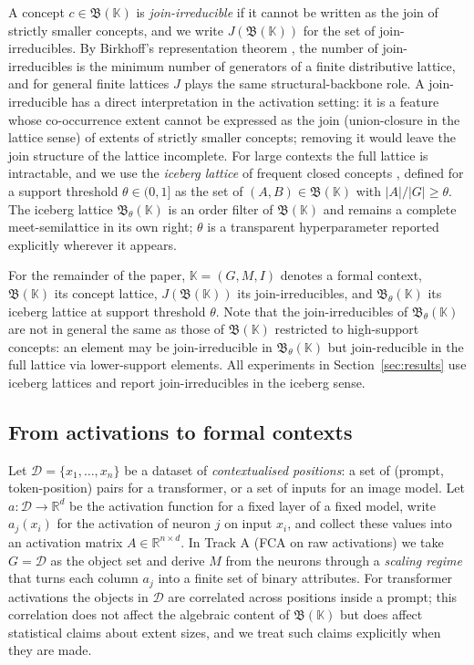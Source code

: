 \documentclass[a4paper,fleqn]{cas-dc}
\newcommand{\R}{\mathbb{R}}
\newcommand{\D}{\mathcal{D}}
\newcommand{\K}{\mathbb{K}}
\newcommand{\Lat}{\mathfrak{B}}
\newcommand{\Jirr}{J}
\begin{document}
A concept $c \in \Lat(\K)$ is \emph{join-irreducible} if it cannot be written as the join of strictly smaller concepts, and we write $\Jirr(\Lat(\K))$ for the set of join-irreducibles.
By Birkhoff's representation theorem \citep{birkhoff1937rings}, the number of join-irreducibles is the minimum number of generators of a finite distributive lattice, and for general finite lattices $\Jirr$ plays the same structural-backbone role.
A join-irreducible has a direct interpretation in the activation setting: it is a feature whose co-occurrence extent cannot be expressed as the join (union-closure in the lattice sense) of extents of strictly smaller concepts; removing it would leave the join structure of the lattice incomplete.
For large contexts the full lattice is intractable, and we use the \emph{iceberg lattice} of frequent closed concepts \citep{stumme2002computing}, defined for a support threshold $\theta \in (0, 1]$ as the set of $(A, B) \in \Lat(\K)$ with $|A|/|G| \ge \theta$.
The iceberg lattice $\Lat_\theta(\K)$ is an order filter of $\Lat(\K)$ and remains a complete meet-semilattice in its own right; $\theta$ is a transparent hyperparameter reported explicitly wherever it appears.

For the remainder of the paper, $\K = (G, M, I)$ denotes a formal context, $\Lat(\K)$ its concept lattice, $\Jirr(\Lat(\K))$ its join-irreducibles, and $\Lat_\theta(\K)$ its iceberg lattice at support threshold $\theta$.
Note that the join-irreducibles of $\Lat_\theta(\K)$ are not in general the same as those of $\Lat(\K)$ restricted to high-support concepts: an element may be join-irreducible in $\Lat_\theta(\K)$ but join-reducible in the full lattice via lower-support elements.
All experiments in Section~\ref{sec:results} use iceberg lattices and report join-irreducibles in the iceberg sense.

\subsection{From activations to formal contexts}\label{ssec:scaling}

Let $\D = \{x_1, \ldots, x_n\}$ be a dataset of \emph{contextualised positions}: a set of (prompt, token-position) pairs for a transformer, or a set of inputs for an image model.
Let $a : \D \to \R^d$ be the activation function for a fixed layer of a fixed model, write $a_j(x_i)$ for the activation of neuron $j$ on input $x_i$, and collect these values into an activation matrix $A \in \R^{n \times d}$.
In Track A (FCA on raw activations) we take $G = \D$ as the object set and derive $M$ from the neurons through a \emph{scaling regime} that turns each column $a_j$ into a finite set of binary attributes.
For transformer activations the objects in $\D$ are correlated across positions inside a prompt; this correlation does not affect the algebraic content of $\Lat(\K)$ but does affect statistical claims about extent sizes, and we treat such claims explicitly when they are made.
\end{document}
